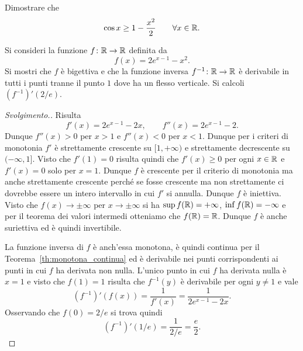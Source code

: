 \begin{exercise}
Dimostrare che
\[
  \cos x \ge 1- \frac{x^2}{2} \qquad \forall x \in \mathbb R.
\]
\end{exercise}

\begin{exercise}
Si consideri la funzione $f\colon \mathbb R \to \mathbb R$ definita da
\[
  f(x) = 2e^{x-1} - x^2.
\]
Si mostri che $f$ è bigettiva e
che la funzione inversa $f^{-1}\colon \mathbb R \to \mathbb R$ è derivabile in
tutti i punti tranne il punto $1$ dove ha un flesso verticale.
Si calcoli $(f^{-1})'(2/e)$.
\end{exercise}
\begin{proof}[Svolgimento.]
Risulta
\[
  f'(x) = 2e^{x-1} - 2x, \qquad f''(x) = 2e^{x-1}-2.
\]
Dunque $f''(x) > 0$ per $x > 1$ e $f''(x)< 0$ per $x<1$.
Dunque per i criteri di monotonia
$f'$ è strettamente crescente su $[1,+\infty)$ e strettamente
decrescente su $(-\infty, 1]$. Visto che $f'(1)=0$ risulta quindi che
$f'(x)\ge 0$ per ogni $x\in \mathbb R$ e $f'(x)=0$ solo per $x=1$.
Dunque $f$ è crescente per il criterio di monotonia ma anche
strettamente crescente perché se fosse crescente ma non strettamente
ci dovrebbe essere un intero intervallo in cui $f'$ si annulla.
Dunque $f$ è iniettiva. Visto che $f(x)\to \pm\infty$ per $x\to \pm\infty$
si ha $\sup f(\mathbb R) = +\infty$, $\inf f(\mathbb R) = -\infty$ e per il teorema dei valori intermedi
otteniamo che $f(\mathbb R)=\mathbb R$. 
Dunque $f$ è anche suriettiva ed è quindi invertibile.

La funzione inversa di $f$ è anch'essa monotona, 
è quindi continua per il Teorema~\ref{th:monotona_continua} ed 
è derivabile nei punti corrispondenti ai punti in cui $f$ ha derivata non nulla.
L'unico punto in cui $f$ ha derivata nulla è $x=1$ e visto che $f(1) = 1$ risulta
che $f^{-1}(y)$ è derivabile per ogni $y\neq 1$ e vale
\[
  (f^{-1})'(f(x)) = \frac{1}{f'(x)} = \frac{1}{2 e^{x-1}-2x}.
\]
Osservando che $f(0)=2/e$ si trova quindi
\[
  (f^{-1})'(1/e) = \frac{1}{2/e} = \frac e 2.
\]
\end{proof}

